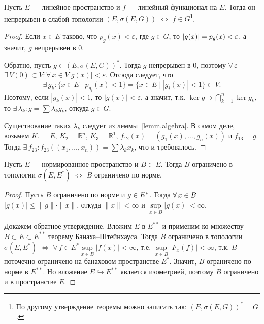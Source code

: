 \documentclass[10pt,titlepage, a4paper]{article}
\begin{document}
\begin{theorem}
Пусть $E$ --- линейное пространство и $f$ --- линейный функционал на
$E$. Тогда он непрерывен в слабой топологии $(E,\sigma(E,G))$
$\Leftrightarrow$ $f\in G$\footnote{По другому утверждение теоремы
можно записать так: $(E,\sigma(E,G))^*=G$.}.
\end{theorem}

\begin{proof}
Если $x\in E$ таково, что $p_g(x)<\varepsilon$, где $g\in G$, то
$|g(x)|\p=p_g(x)<\varepsilon$, а значит, $g$ непрерывен в 0.

Обратно, пусть $g\in (E,\sigma(E,G))^*$. Тогда $g$ непрерывен в 0,
поэтому $\forall\,\varepsilon$\;\;$\exists\,V(0)\subset
V:\forall\,x\in V$\;\;$|g(x)|<\varepsilon$. Отсюда следует, что
$$\exists\, g_k:\{x\in E\mid p_{g_i}(x)<1\}=\{x\in E\mid
|g_i(x)|<1\}\subset V.$$ Поэтому, если $|g_k(x)|<1$, то
$|g(x)|<\varepsilon$, а значит, т.к. $\ker g\supset
\bigcap\limits_{k=1}^n\ker g_k$, то $\exists\,
\lambda_k:g=\sum\lambda_kg_k$, откуда $g\in G$.

Существование таких $\lambda_k$ следует из леммы~\ref{lemm.algebra}.
В самом деле, возьмем $K_1=E$, $K_2=\mathbb{R}^n$,
$K_3=\mathbb{R}^1$, $f_{12}(x)=(g_1(x),\ldots,g_n(x))$ и $f_{13}=g$.
Тогда $\exists\,f_{23}:f_{23}((x_1,\ldots,x_n))=\sum\lambda_kx_k$,
что и требовалось.
\end{proof}

\begin{theorem}
Пусть $E$ --- нормированное пространство и $B\subset E$. Тогда $B$
ограничено в топологии $\sigma(E, E^*)$ $\Leftrightarrow$ $B$
ограничено по норме.
\end{theorem}

\begin{proof}
Пусть $B$ ограничено по норме и $g\p\in E^*$. Тогда $\forall\,x\p\in
B$\;\;$|g(x)|\leqslant \|g\|\cdot\|x\|$, откуда $\|x\|<\infty$ и
$\sup\limits_{x\in B}|g(x)|<\infty$.

Докажем обратное утверждение. Вложим $E$ в $E^{**}$ и применим ко
множеству $B\subset E\subset E^{**}$ теорему Банаха--Штейнхауса.
Тогда $B$ ограничено в топологии $\sigma(E,E^*)$ $\Leftrightarrow$
$\forall\,f\in E^*$\;\;$\sup\limits_{x\in B}|f(x)|<\infty$, т.е.
$\sup\limits_{x\in B}|F_x(f)|<\infty$, т.к. $B$ поточечно ограничено
на банаховом пространстве $E^*$. Значит, $B$ ограничено по норме в
$E^{**}$. Но вложение $E\hookrightarrow E^{**}$ является изометрией,
поэтому $B$ ограничено и в пространстве $E$.
\end{proof}
\end{document}
